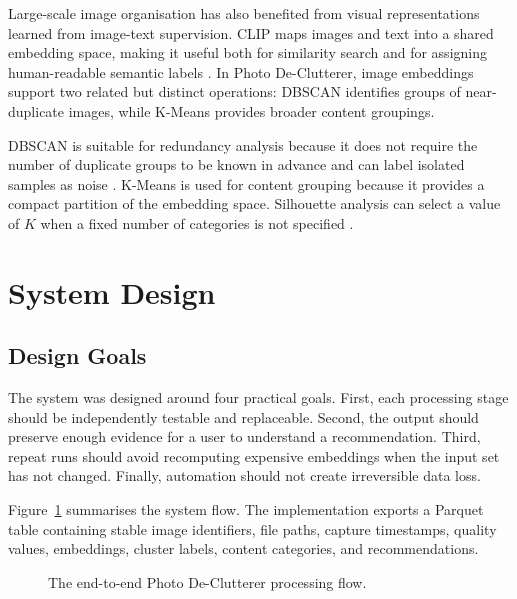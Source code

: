 \documentclass[conference]{IEEEtran}
\newcommand{\project}{Photo De-Clutterer}
\begin{document}
Large-scale image organisation has also benefited from visual representations learned from image-text supervision. CLIP maps images and text into a shared embedding space, making it useful both for similarity search and for assigning human-readable semantic labels \cite{radford2021learning}. In \project{}, image embeddings support two related but distinct operations: DBSCAN identifies groups of near-duplicate images, while K-Means provides broader content groupings.

DBSCAN is suitable for redundancy analysis because it does not require the number of duplicate groups to be known in advance and can label isolated samples as noise \cite{ester1996density}. K-Means is used for content grouping because it provides a compact partition of the embedding space. Silhouette analysis can select a value of $K$ when a fixed number of categories is not specified \cite{rousseeuw1987silhouettes}.

\section{System Design}
\subsection{Design Goals}
The system was designed around four practical goals. First, each processing stage should be independently testable and replaceable. Second, the output should preserve enough evidence for a user to understand a recommendation. Third, repeat runs should avoid recomputing expensive embeddings when the input set has not changed. Finally, automation should not create irreversible data loss.

Figure~\ref{fig:pipeline} summarises the system flow. The implementation exports a Parquet table containing stable image identifiers, file paths, capture timestamps, quality values, embeddings, cluster labels, content categories, and recommendations.

\begin{figure}[htbp]
\centering
\setlength{\fboxsep}{5pt}
\caption{The end-to-end \project{} processing flow.}
\label{fig:pipeline}
\end{figure}
\end{document}

